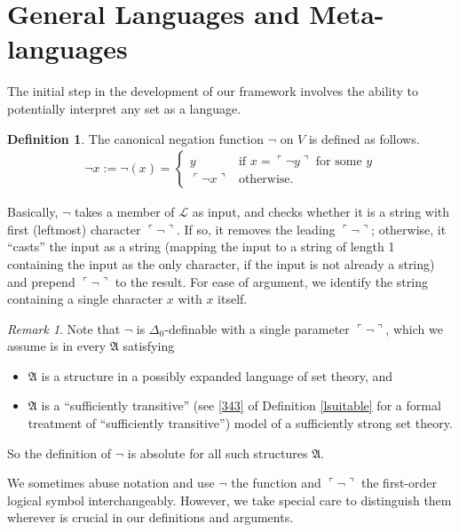\documentclass[12pt, twoside]{memoir}
\numberwithin{equation}{section}
\theoremstyle{definition}
\newtheorem{defi}[thm]{Definition}
\theoremstyle{remark}
\newtheorem{rem}[thm]{Remark}
\theoremstyle{definition}
\theoremstyle{definition}
\theoremstyle{definition}
\theoremstyle{remark}
\begin{document}
\section{General Languages and Meta-languages}

The initial step in the development of our framework involves the ability to potentially interpret any set as a language. 

\begin{defi}\label{neg}
The canonical negation function $\neg$ on $V$ is defined as follows. 
\begin{align*}
    \neg x := \neg(x) = 
    \begin{cases}
        y & \text{if } x = \ulcorner \neg y \urcorner \text{ for some } y \\
        \ulcorner \neg x \urcorner & \text{otherwise}.
    \end{cases}
\end{align*}
\end{defi}

Basically, $\neg$ takes a member of $\mathcal{L}$ as input, and checks whether it is a string with first (leftmost) character $\ulcorner \neg \urcorner$. If so, it removes the leading $\ulcorner \neg \urcorner$; otherwise, it ``casts'' the input as a string (mapping the input to a string of length 1 containing the input as the only character, if the input is not already a string) and prepend $\ulcorner \neg \urcorner$ to the result. For ease of argument, we identify the string containing a single character $x$ with $x$ itself. 

\begin{rem}\label{rem32}
Note that $\neg$ is $\Delta_0$-definable with a single parameter $\ulcorner \neg \urcorner$, which we assume is in every $\mathfrak{A}$ satisfying
\begin{itemize}
    \item $\mathfrak{A}$ is a structure in a possibly expanded language of set theory, and
    \item $\mathfrak{A}$ is a ``sufficiently transitive'' (see \ref{343} of Definition \ref{lsuitable} for a formal treatment of ``sufficiently transitive'') model of a sufficiently strong set theory.
\end{itemize} 
So the definition of $\neg$ is absolute for all such structures $\mathfrak{A}$.
\end{rem}

We sometimes abuse notation and use $\neg$ the function and $\ulcorner \neg \urcorner$ the first-order logical symbol interchangeably. However, we take special care to distinguish them wherever is crucial in our definitions and arguments.
\end{document}
